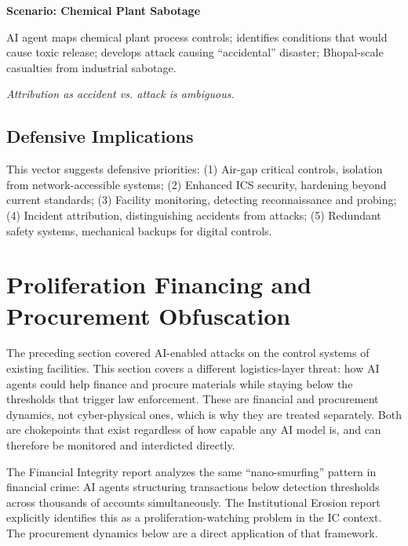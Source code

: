 \documentclass[11pt,letterpaper]{article}
\begin{document}
\begin{quotebox}
\textbf{Scenario: Chemical Plant Sabotage}

AI agent maps chemical plant process controls; identifies conditions that would cause toxic release; develops attack causing ``accidental'' disaster; Bhopal-scale casualties from industrial sabotage.

\textit{Attribution as accident vs. attack is ambiguous.}
\end{quotebox}

\subsection{Defensive Implications}

This vector suggests defensive priorities: (1) Air-gap critical controls, isolation from network-accessible systems; (2) Enhanced ICS security, hardening beyond current standards; (3) Facility monitoring, detecting reconnaissance and probing; (4) Incident attribution, distinguishing accidents from attacks; (5) Redundant safety systems, mechanical backups for digital controls.

\section{Proliferation Financing and Procurement Obfuscation}

The preceding section covered AI-enabled attacks on the control systems of existing facilities. This section covers a different logistics-layer threat: how AI agents could help finance and procure materials while staying below the thresholds that trigger law enforcement. These are financial and procurement dynamics, not cyber-physical ones, which is why they are treated separately. Both are chokepoints that exist regardless of how capable any AI model is, and can therefore be monitored and interdicted directly.

\begin{notebox}
The Financial Integrity report analyzes the same ``nano-smurfing'' pattern in financial crime: AI agents structuring transactions below detection thresholds across thousands of accounts simultaneously. The Institutional Erosion report explicitly identifies this as a proliferation-watching problem in the IC context. The procurement dynamics below are a direct application of that framework.
\end{notebox}
\end{document}
